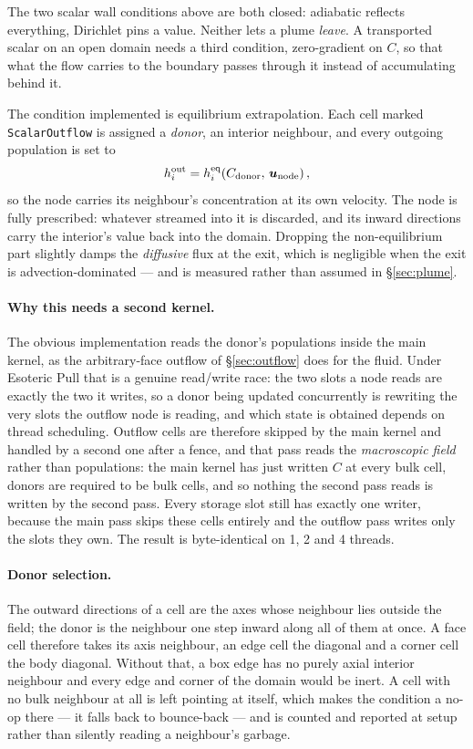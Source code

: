 \documentclass[11pt,a4paper]{article}
\newcommand{\uu}{\bm{u}}
\begin{document}
The two scalar wall conditions above are both closed: adiabatic reflects
everything, Dirichlet pins a value. Neither lets a plume \emph{leave}. A
transported scalar on an open domain needs a third condition, zero-gradient on
$C$, so that what the flow carries to the boundary passes through it instead of
accumulating behind it.

The condition implemented is equilibrium extrapolation. Each cell marked
\texttt{ScalarOutflow} is assigned a \emph{donor}, an interior neighbour, and
every outgoing population is set to
\begin{equation}
  h_i^{\rm out} = h_i^{\rm eq}\!\left(C_{\rm donor},\, \uu_{\rm node}\right),
  \label{eq:scalarout}
\end{equation}
so the node carries its neighbour's concentration at its own velocity. The node
is fully prescribed: whatever streamed into it is discarded, and its inward
directions carry the interior's value back into the domain. Dropping the
non-equilibrium part slightly damps the \emph{diffusive} flux at the exit,
which is negligible when the exit is advection-dominated --- and is measured
rather than assumed in \S\ref{sec:plume}.

\paragraph{Why this needs a second kernel.} The obvious implementation reads the
donor's populations inside the main kernel, as the arbitrary-face outflow of
\S\ref{sec:outflow} does for the fluid. Under Esoteric Pull that is a genuine
read/write race: the two slots a node reads are exactly the two it writes, so a
donor being updated concurrently is rewriting the very slots the outflow node is
reading, and which state is obtained depends on thread scheduling. Outflow cells
are therefore skipped by the main kernel and handled by a second one after a
fence, and that pass reads the \emph{macroscopic field} rather than
populations: the main kernel has just written $C$ at every bulk cell, donors are
required to be bulk cells, and so nothing the second pass reads is written by
the second pass. Every storage slot still has exactly one writer, because the
main pass skips these cells entirely and the outflow pass writes only the slots
they own. The result is byte-identical on 1, 2 and 4 threads.

\paragraph{Donor selection.} The outward directions of a cell are the axes whose
neighbour lies outside the field; the donor is the neighbour one step inward
along all of them at once. A face cell therefore takes its axis neighbour, an
edge cell the diagonal and a corner cell the body diagonal. Without that, a box
edge has no purely axial interior neighbour and every edge and corner of the
domain would be inert. A cell with no bulk neighbour at all is left pointing at
itself, which makes the condition a no-op there --- it falls back to
bounce-back --- and is counted and reported at setup rather than silently
reading a neighbour's garbage.
\end{document}
